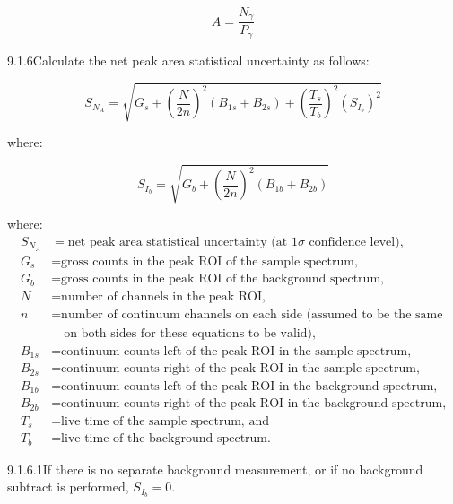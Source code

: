 \documentclass[12pt]{article}
\begin{document}
\begin{equation}
  A = \frac{N_\gamma}{P_\gamma}
  \label{eq:transmutation_rate}
\end{equation}

9.1.6\quad Calculate the net peak area statistical uncertainty as follows:

\begin{equation}
  S_{N_A} = \sqrt{G_s + \left(\frac{N}{2n}\right)^{\!2}\!\left(B_{1s}+B_{2s}\right)
    + \left(\frac{T_s}{T_b}\right)^{\!2}\!\left(S_{I_b}\right)^2}
  \label{eq:stat_uncertainty}
\end{equation}

\noindent where:

\begin{equation}
  S_{I_b} = \sqrt{G_b + \left(\frac{N}{2n}\right)^{\!2}\!\left(B_{1b}+B_{2b}\right)}
  \label{eq:bg_uncertainty}
\end{equation}

\noindent where:
\begin{align*}
  S_{N_A} &= \text{net peak area statistical uncertainty (at }1\sigma\text{ confidence level),}\\
  G_s     &= \text{gross counts in the peak ROI of the sample spectrum,}\\
  G_b     &= \text{gross counts in the peak ROI of the background spectrum,}\\
  N       &= \text{number of channels in the peak ROI,}\\
  n       &= \text{number of continuum channels on each side (assumed to be the same}\\
           &\quad\text{on both sides for these equations to be valid),}\\
  B_{1s}  &= \text{continuum counts left of the peak ROI in the sample spectrum,}\\
  B_{2s}  &= \text{continuum counts right of the peak ROI in the sample spectrum,}\\
  B_{1b}  &= \text{continuum counts left of the peak ROI in the background spectrum,}\\
  B_{2b}  &= \text{continuum counts right of the peak ROI in the background spectrum,}\\
  T_s     &= \text{live time of the sample spectrum, and}\\
  T_b     &= \text{live time of the background spectrum.}
\end{align*}

9.1.6.1\quad If there is no separate background measurement, or if no background subtract
is performed, $S_{I_b} = 0$.
\end{document}
